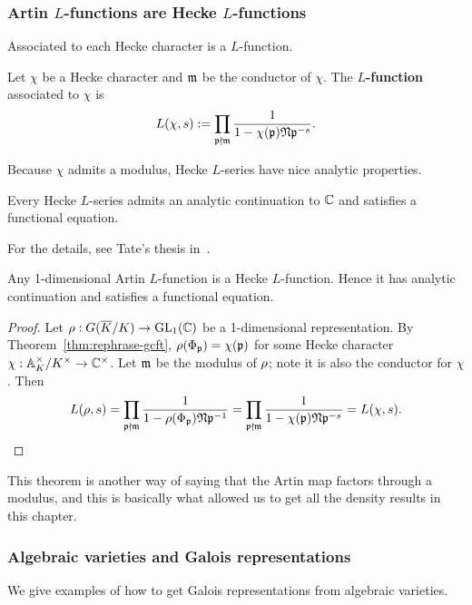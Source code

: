 \subsubsection{Artin $L$-functions are Hecke $L$-functions}
Associated to each Hecke character is a $L$-function.
\begin{df}
Let $\chi$ be a Hecke character and $\mathfrak{m}$ be the conductor of $\chi$. The \textbf{$L$-function} associated to $\chi$ is
\[
L(\chi,s):%
=\prod_{\mfp\nmid \mm}\rc{1-\chi(\mfp)\fN\mfp^{-s}}.
\]
\end{df}
Because $\chi$ admits a modulus, Hecke $L$-series have nice analytic properties.
\begin{thm}
Every Hecke $L$-series admits an analytic continuation to $\mathbb{C}$ and satisfies a functional equation.
\end{thm}
For the details, see Tate's thesis in~\cite{CF69}.
\begin{thm}
Any 1-dimensional Artin $L$-function is a Hecke $L$-function. Hence it has analytic continuation and satisfies a functional equation.
\end{thm}
\begin{proof}
Let $\rho:G(\overline{K}/K)\to \operatorname{GL}_1(\mathbb{C})$ be a 1-dimensional representation. 
By Theorem~\ref{thm:rephrase-gcft}, $\rho(\Phi_{\mathfrak{p}})=\chi(\mathfrak{p})$ for some Hecke character $\chi:\mathbb{A}_K^{\times}/K^{\times}\to \mathbb{C}^{\times}$. Let $\mathfrak{m}$ be the modulus of $\rho$; note it is also the conductor for $\chi$. Then
\[
L(\rho,s)=\prod_{\mathfrak{p}\nmid \mathfrak{m}}\frac{1}{1-\rho(\Phi_{\mathfrak{p}}) \mathfrak{N}\mathfrak{p}^{-1}}=\prod_{\mathfrak{p}\nmid \mathfrak{m}}\frac{1}{1-\chi(\mathfrak{p})\mathfrak{N}\mathfrak{p}^{-s}} =L(\chi,s).
\]
\end{proof}
This theorem is another way of saying that the Artin map factors through a modulus, and this is basically what allowed us to get all the density results in this chapter.
\subsubsection{Algebraic varieties and Galois representations}
We give examples of how to get Galois representations from algebraic varieties.

